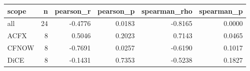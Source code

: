 \begin{tabular}{lrrrrr}
\toprule
scope &  n &  pearson\_r &  pearson\_p &  spearman\_rho &  spearman\_p \\
\midrule
  all & 24 &    -0.4776 &     0.0183 &       -0.8165 &      0.0000 \\
 ACFX &  8 &     0.5046 &     0.2023 &        0.7143 &      0.0465 \\
CFNOW &  8 &    -0.7691 &     0.0257 &       -0.6190 &      0.1017 \\
 DiCE &  8 &    -0.1431 &     0.7353 &       -0.5238 &      0.1827 \\
\bottomrule
\end{tabular}
